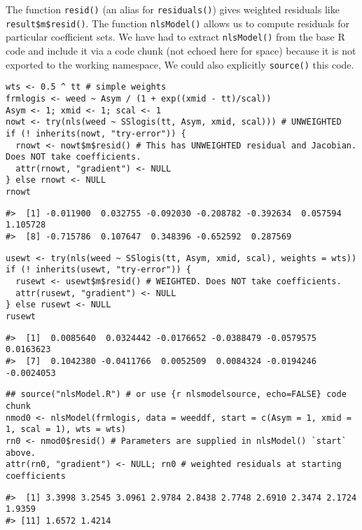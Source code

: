 The function \texttt{resid()} (an alias for \texttt{residuals()}) gives weighted residuals
like \texttt{result\$m\$resid()}. The function \texttt{nlsModel()}
allows us to compute residuals for particular coefficient sets.
We have had to extract \texttt{nlsModel()} from the base R code and include it via a code chunk
(not echoed here for space) because it is not exported to the working namespace,
We could also explicitly \texttt{source()} this code.

\begin{verbatim}
wts <- 0.5 ^ tt # simple weights
frmlogis <- weed ~ Asym / (1 + exp((xmid - tt)/scal))
Asym <- 1; xmid <- 1; scal <- 1
nowt <- try(nls(weed ~ SSlogis(tt, Asym, xmid, scal))) # UNWEIGHTED
if (! inherits(nowt, "try-error")) {
  rnowt <- nowt$m$resid() # This has UNWEIGHTED residual and Jacobian. Does NOT take coefficients.
  attr(rnowt, "gradient") <- NULL 
} else rnowt <- NULL
rnowt
\end{verbatim}

\begin{verbatim}
#>  [1] -0.011900  0.032755 -0.092030 -0.208782 -0.392634  0.057594  1.105728
#>  [8] -0.715786  0.107647  0.348396 -0.652592  0.287569
\end{verbatim}

\begin{verbatim}
usewt <- try(nls(weed ~ SSlogis(tt, Asym, xmid, scal), weights = wts))
if (! inherits(usewt, "try-error")) {
  rusewt <- usewt$m$resid() # WEIGHTED. Does NOT take coefficients.
  attr(rusewt, "gradient") <- NULL
} else rusewt <- NULL
rusewt
\end{verbatim}

\begin{verbatim}
#>  [1]  0.0085640  0.0324442 -0.0176652 -0.0388479 -0.0579575  0.0163623
#>  [7]  0.1042380 -0.0411766  0.0052509  0.0084324 -0.0194246 -0.0024053
\end{verbatim}

\begin{verbatim}
## source("nlsModel.R") # or use {r nlsmodelsource, echo=FALSE} code chunk
nmod0 <- nlsModel(frmlogis, data = weeddf, start = c(Asym = 1, xmid = 1, scal = 1), wts = wts)
rn0 <- nmod0$resid() # Parameters are supplied in nlsModel() `start` above.
attr(rn0, "gradient") <- NULL; rn0 # weighted residuals at starting coefficients
\end{verbatim}

\begin{verbatim}
#>  [1] 3.3998 3.2545 3.0961 2.9784 2.8438 2.7748 2.6910 2.3474 2.1724 1.9359
#> [11] 1.6572 1.4214
\end{verbatim}

